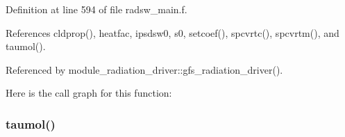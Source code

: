 Definition at line 594 of file radsw\+\_\+main.\+f.



References cldprop(), heatfac, ipsdsw0, s0, setcoef(), spcvrtc(), spcvrtm(), and taumol().



Referenced by module\+\_\+radiation\+\_\+driver\+::gfs\+\_\+radiation\+\_\+driver().

Here is the call graph for this function\+:
\mbox{\label{group__module__radsw__main_gaa82121d21c1e8f2ca938378249fea135}} 
\subsubsection{\texorpdfstring{taumol()}{taumol()}}
